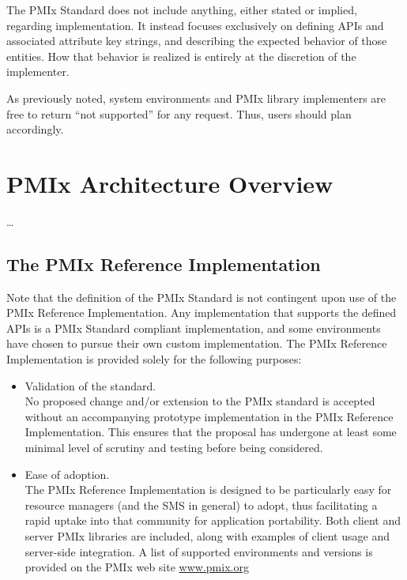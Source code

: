 The \ac{PMIx} Standard does not include anything, either stated or implied, regarding implementation.
It instead focuses exclusively on defining APIs and associated attribute key strings, and describing the expected behavior of those entities.
How that behavior is realized is entirely at the discretion of the implementer.

As previously noted, system environments and \ac{PMIx} library implementers are free to return ``not supported'' for any request. Thus, users should plan accordingly.


\section{PMIx Architecture Overview}
\label{chap:intro:arch_overview}

\ldots

\subsection{The PMIx Reference Implementation}

Note that the definition of the \ac{PMIx} Standard is not contingent upon use of the \ac{PMIx} Reference Implementation.
Any implementation that supports the defined APIs is a \ac{PMIx} Standard compliant implementation, and some environments have chosen to pursue their own custom implementation.
The \ac{PMIx} Reference Implementation is provided solely for the following purposes:
\begin{itemize}
\item Validation of the standard.\\
No proposed change and/or extension to the \ac{PMIx} standard is accepted without an accompanying prototype implementation in the \ac{PMIx} Reference Implementation.
This ensures that the proposal has undergone at least some minimal level of scrutiny and testing before being considered.
\item Ease of adoption.\\
The \ac{PMIx} Reference Implementation is designed to be particularly easy for resource managers (and the \ac{SMS} in general) to adopt, thus facilitating a rapid uptake into that community for application portability.
Both client and server \ac{PMIx} libraries are included, along with examples of client usage and server-side integration.
A list of supported environments and versions is provided on the \ac{PMIx} web site \url{www.pmix.org}
\end{itemize}

